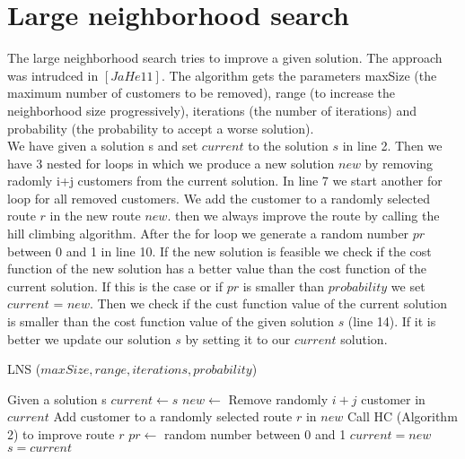 \documentclass[fleqn]{scrartcl}
\begin{document}
\newpage
\section{Large neighborhood search}

The large neighborhood search tries to improve a given solution. The approach was intrudced in $[JaHe 11]$. The algorithm gets the parameters maxSize (the maximum number of customers to be removed), range (to increase the neighborhood size progressively), iterations (the number of iterations) and probability (the probability to accept a worse solution). \\
We have given a solution s and set $current$ to the solution $s$ in line 2. Then we have 3 nested for loops in which we produce a new solution $new$ by removing radomly i+j customers from the current solution. In line 7 we start another for loop for all removed customers. We add the customer to a randomly selected route $r$ in the new route $new$. then we always improve the route by calling the hill climbing algorithm. After the for loop we generate a random number $pr$ between 0 and 1 in line 10. If the new solution is feasible we check if the cost function of the new solution has a better value than the cost function of the current solution. If this is the case or if $pr$ is smaller than $probability$ we set $current$ = $new$. Then we check if the cust function value of the current solution is smaller than the cost function value of the given solution $s$ (line 14). If it is better we update our solution $s$ by setting it to our $current$ solution.
 
\begin{algorithm}
\caption{LNS ($maxSize, range, iterations, probability$)}\label{lns}
\begin{algorithmic}[1]
\State Given a solution s
\State $current \gets s$
\State $new \gets$ Remove randomly $i+j$ customer in $current$
\State Add customer to a randomly selected route $r$ in $new$
\State Call HC (Algorithm 2) to improve route $r$
\EndFor
\State $pr \gets$ random number between 0 and 1
\State $current = new$
\State $s = current$
\EndIf
\EndIf
\EndIf
\EndFor
\EndFor
\EndFor
\end{algorithmic}
\end{algorithm}
\newpage
\end{document}
